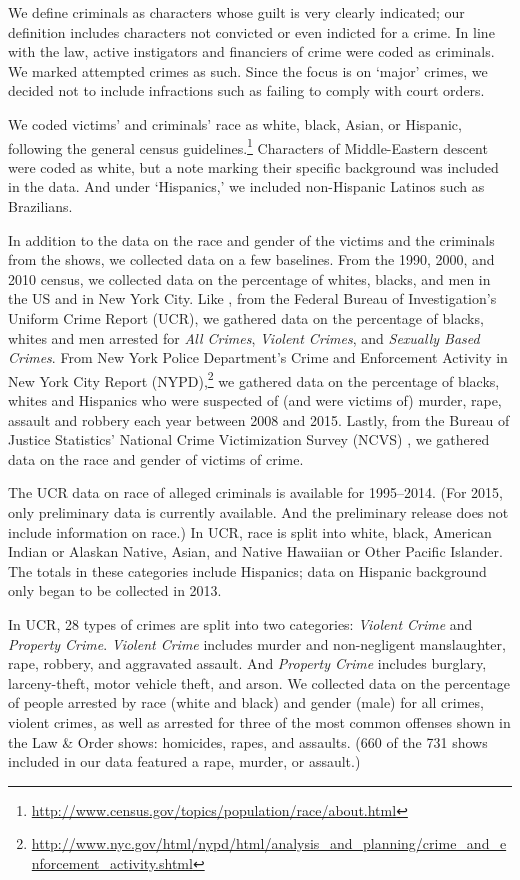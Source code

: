 \documentclass[12pt, letterpaper]{article}
\begin{document}
We define criminals as characters whose guilt is very clearly indicated; our definition includes characters not convicted or even indicted for a crime. In line with the law, active instigators and financiers of crime were coded as criminals. We marked attempted crimes as such. Since the focus is on `major' crimes, we decided not to include infractions such as failing to comply with court orders. 

We coded victims' and criminals' race as white, black, Asian, or Hispanic, following the general census guidelines.\footnote{\url{http://www.census.gov/topics/population/race/about.html}} Characters of Middle-Eastern descent were coded as white, but a note marking their specific background was included in the data. And under `Hispanics,' we included non-Hispanic Latinos such as Brazilians.

In addition to the data on the race and gender of the victims and the criminals from the shows, we collected data on a few baselines. From the 1990, 2000, and 2010 census, we collected data on the percentage of whites, blacks, and men in the US and in New York City. Like \citet{dixon2000overrepresentation}, from the Federal Bureau of Investigation's Uniform Crime Report (UCR), we gathered data on the percentage of blacks, whites and men arrested for \textit{All Crimes}, \textit{Violent Crimes}, and \textit{Sexually Based Crimes}. From New York Police Department's Crime and Enforcement Activity in New York City Report (NYPD),\footnote{\url{http://www.nyc.gov/html/nypd/html/analysis_and_planning/crime_and_enforcement_activity.shtml}} we gathered data on the percentage of blacks, whites and Hispanics who were suspected of (and were victims of) murder, rape, assault and robbery each year between 2008 and 2015. Lastly, from the Bureau of Justice Statistics' National Crime Victimization Survey (NCVS) \citep{powers2016national, victimization1998national}, we gathered data on the race and gender of victims of crime.  

The UCR data on race of alleged criminals is available for 1995--2014. (For 2015, only preliminary data is currently available. And the preliminary release does not include information on race.) In UCR, race is split into white, black, American Indian or Alaskan Native, Asian, and Native Hawaiian or Other Pacific Islander. The totals in these categories include Hispanics; data on Hispanic background only began to be collected in 2013. 

In UCR, 28 types of crimes are split into two categories: \textit{Violent Crime} and \textit{Property Crime}. \textit{Violent Crime} includes murder and non-negligent manslaughter, rape, robbery, and aggravated assault. And \textit{Property Crime} includes burglary, larceny-theft, motor vehicle theft, and arson. We collected data on the percentage of people arrested by race (white and black) and gender (male) for all crimes, violent crimes, as well as arrested for three of the most common offenses shown in the Law \& Order shows: homicides, rapes, and assaults. (660 of the 731 shows included in our data featured a rape, murder, or assault.)
\end{document}
